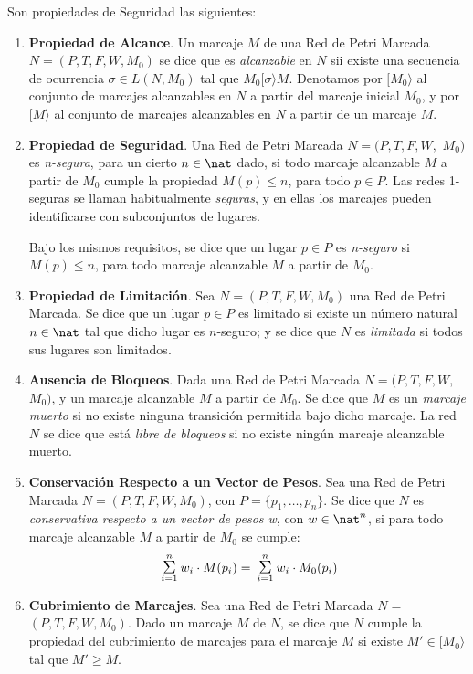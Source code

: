 Son propiedades de Seguridad las
siguientes:
\begin{enumerate}
\item {\bf Propiedad de Alcance}. Un marcaje $M$ de una Red de Petri
Marcada $N= (P,T,F,W,M_0)$ se dice que es {\it alcanzable} en $N$
sii existe una secuencia de ocurrencia $\sigma \in L(N,M_0)$
tal que $M_0 [ \sigma \rangle M$. Denotamos por $[M_0\rangle$ al
conjunto de marcajes alcanzables en $N$ a partir del marcaje
inicial $M_0$, y por $[ M \rangle$ al conjunto de marcajes alcanzables
en $N$ a partir de un marcaje $M$.
\item {\bf Propiedad de Seguridad}. Una Red de Petri Marcada
$N=(P,T,F,W,$ \linebreak
$M_0)$ es {\it n-segura}, para un cierto $n \in \nat$ dado, si todo
marcaje alcanzable $M$ a partir de $M_0$ cumple la
propiedad $M(p) \leq n$, para todo $p \in P$. Las redes
1-seguras se llaman habitualmente {\it seguras}, y en ellas los
marcajes pueden identificarse con subconjuntos de lugares.

Bajo los mismos requisitos, se dice que un lugar $p \in P$ es
{\it n-seguro} si $M(p) \leq n$, para todo marcaje alcanzable
$M$ a partir de $M_0$.
\item {\bf Propiedad de Limitaci\'{o}n}. Sea
$N=(P,T,F,W,M_0)$ una Red de Petri Marcada.
Se dice que un lugar $p \in P$ es limitado si
existe un n\'{u}mero natural $n \in \nat$ tal que dicho lugar es
$n$-seguro; y se dice que $N$ es {\it limitada} si todos sus lugares
son limitados.
\item {\bf Ausencia de Bloqueos}. Dada una Red de Petri Marcada
$N=(P,T,F,W,$ \linebreak
$M_0)$, y un marcaje alcanzable $M$ a partir de $M_0$.
Se dice que $M$ es un {\it marcaje muerto} si no existe ninguna
transici\'{o}n permitida bajo dicho marcaje. La red $N$ se dice
que est\'{a} {\it libre de bloqueos} si no existe ning\'{u}n marcaje
alcanzable muerto.
\item {\bf Conservaci\'{o}n Respecto a un Vector de Pesos}.
Sea una Red de Petri Marcada $N=(P,T,F,W,M_0)$, con
$P = \{p_1,\ldots,p_n\}$. Se dice que $N$ es
{\it conservativa respecto a un vector de pesos w}, con
$w \in \nat^n$, si para todo marcaje alcanzable $M$
a partir de $M_0$ se cumple:
\[ \suma{i=1}{n} w_i \cdot M(p_i) =
\suma{i=1}{n} w_i \cdot M_0(p_i)\]
\item {\bf Cubrimiento de Marcajes}.
Sea una Red de Petri Mar\-cada $N=$ \linebreak $(P,T,F,W,
M_0)$. Dado un marcaje $M$ de $N$, se dice que $N$ cumple la propiedad
del cubrimiento de marcajes para el marcaje $M$ si existe $M' \in
[M_0 \rangle$ tal que $M' \geq M$.
\end{enumerate}

